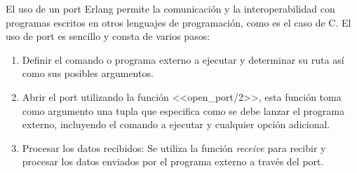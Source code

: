    El uso de un port Erlang permite la comunicación y la interoperabilidad con programas escritos en otros lenguajes de programación, como es el caso de C. El uso de port es sencillo y consta de varios pasos:
   \begin{enumerate}
       \item Definir el comando o programa externo a ejecutar y determinar su ruta así como sus posibles argumentos.
       \item Abrir el port utilizando la función <<open\_port/2>>, esta función toma como argumento una tupla que especifica como se debe lanzar el programa externo, incluyendo el comando a ejecutar y cualquier opción adicional.
       \item Procesar los datos recibidos: Se utiliza la función \textit{receive} para recibir y procesar los datos enviados por el programa externo a través del port.
   \end{enumerate}

